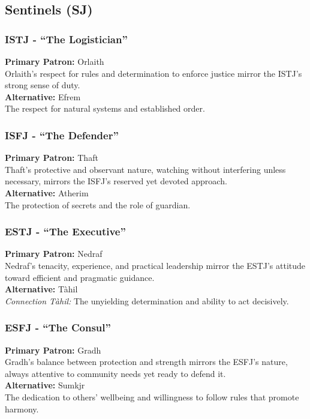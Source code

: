 \documentclass[a4paper,twoside,openany]{book}
\begin{document}
\begin{multicols}{2}
	\subsection*{Sentinels (SJ)}
	\subsubsection*{ISTJ - ``The Logistician''}
	\textbf{Primary Patron:} Orlaith\\
	Orlaith's respect for rules and determination to enforce justice mirror the ISTJ's strong sense of duty.\\
	\textbf{Alternative:} Efrem\\
	The respect for natural systems and established order.

	\subsubsection*{ISFJ - ``The Defender''}
	\textbf{Primary Patron:} Thaft\\
	Thaft's protective and observant nature, watching without interfering unless necessary, mirrors the ISFJ's reserved yet devoted approach.\\
	\textbf{Alternative:} Atherim\\
	The protection of secrets and the role of guardian.

	\subsubsection*{ESTJ - ``The Executive''}
	\textbf{Primary Patron:} Nedraf\\
	Nedraf's tenacity, experience, and practical leadership mirror the ESTJ's attitude toward efficient and pragmatic guidance.\\
	\textbf{Alternative:} Tàhil\\
	\textit{Connection Tàhil:} The unyielding determination and ability to act decisively.

	\subsubsection*{ESFJ - ``The Consul''}
	\textbf{Primary Patron:} Gradh\\
	Gradh's balance between protection and strength mirrors the ESFJ's nature, always attentive to community needs yet ready to defend it.\\
	\textbf{Alternative:} Sumkjr\\
	The dedication to others' wellbeing and willingness to follow rules that promote harmony.


\end{multicols}
\end{document}
